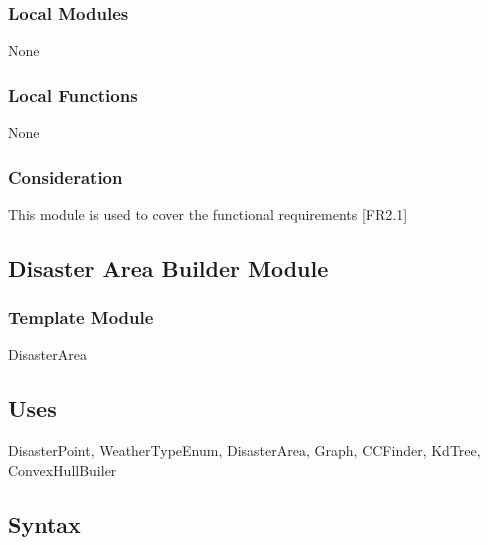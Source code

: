 \documentclass[12pt]{article}
\begin{document}
                    \subsubsection*{Local Modules}
                    
                    None
                    
                    \subsubsection*{Local Functions}
                    
                    None
                    
                    \subsubsection*{Consideration}
                    
                    This module is used to cover the functional requirements [FR2.1]
                    
                   \newpage
                \subsection* {Disaster Area Builder Module}
                
                \subsubsection*{Template Module}
                
                DisasterArea
                
                \subsection* {Uses}
                
                DisasterPoint, WeatherTypeEnum, DisasterArea, Graph, CCFinder, KdTree, ConvexHullBuiler
                
                \subsection* {Syntax}
                
\end{document}
